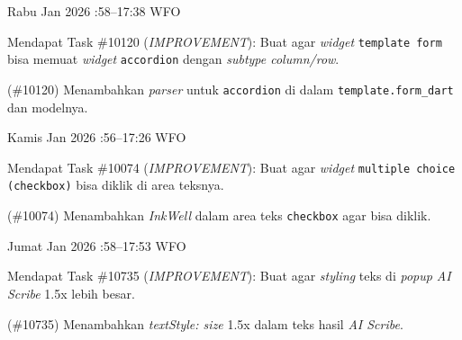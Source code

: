 \begin{logtable}
    {
        Rabu  Jan 2026 :58--17:38 \linebreak
        WFO
    }{
        \begin{loglist}
            \item Mendapat Task \#10120 (\textit{IMPROVEMENT}): Buat agar \textit{widget}
            \texttt{template form} bisa memuat \textit{widget} \texttt{accordion} dengan
            \textit{subtype column/row}.
        \end{loglist}
    }{
        \begin{logwork}
            \item (\#10120) Menambahkan \textit{parser} untuk \texttt{accordion} di dalam \texttt{template.form\_dart} dan modelnya.
        \end{logwork}
    }

    {
        Kamis  Jan 2026 :56--17:26 \linebreak
        WFO
    }{
        \begin{loglist}
            \item Mendapat Task \#10074 (\textit{IMPROVEMENT}): Buat agar \textit{widget}
            \texttt{multiple choice (checkbox)} bisa diklik di area teksnya.
        \end{loglist}
    }{
        \begin{logwork}
            \item (\#10074) Menambahkan \textit{InkWell} dalam area teks \texttt{checkbox} agar bisa diklik.
        \end{logwork}
    }

    {
        Jumat  Jan 2026 :58--17:53 \linebreak
        WFO
    }{
        \begin{loglist}
            \item Mendapat Task \#10735 (\textit{IMPROVEMENT}): Buat agar \textit{styling} teks
            di \textit{popup AI Scribe} 1.5x lebih besar.
        \end{loglist}
    }{
        \begin{logwork}
            \item (\#10735) Menambahkan \textit{textStyle: size} 1.5x dalam teks hasil \textit{AI Scribe}.
        \end{logwork}
    }


\end{logtable}
